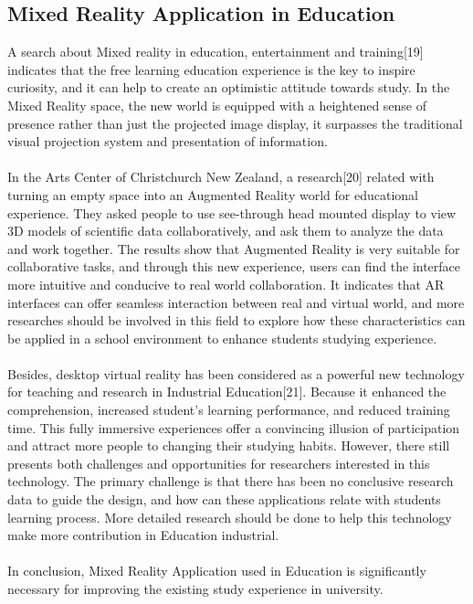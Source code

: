 \subsection{Mixed Reality Application in Education}
A search about Mixed reality in education, entertainment and training[19] indicates that the free learning education experience is the key to inspire curiosity, and it can help to create an optimistic attitude towards study. In the Mixed Reality space, the new world is equipped with a heightened sense of presence rather than just the projected image display, it surpasses the traditional visual projection system and presentation of information. 
\\
\\
In the Arts Center of Christchurch New Zealand, a research[20] related with turning an empty space into an Augmented Reality world for educational experience. They asked people to use see-through head mounted display to view 3D models of scientific data collaboratively, and ask them to analyze the data and work together. The results show that Augmented Reality is very suitable for collaborative tasks, and through this new experience, users can find the interface more intuitive and conducive to real world collaboration. It indicates that AR interfaces can offer seamless interaction between real and virtual world, and more researches should be involved in this field to explore how these characteristics can be applied in a school environment to enhance students studying experience.
\\
\\
Besides, desktop virtual reality has been considered as a powerful new technology for teaching and research in Industrial Education[21]. Because it enhanced the comprehension, increased student’s learning performance, and reduced training time. This fully immersive experiences offer a convincing illusion of participation and attract more people to changing their studying habits. However, there still presents both challenges and opportunities for researchers interested in this technology. The primary challenge is that there has been no conclusive research data to guide the design, and how can these applications relate with students learning process. More detailed research should be done to help this technology make more contribution in Education industrial.
\\
\\
In conclusion, Mixed Reality Application used in Education is significantly necessary for improving the existing study experience in university.



